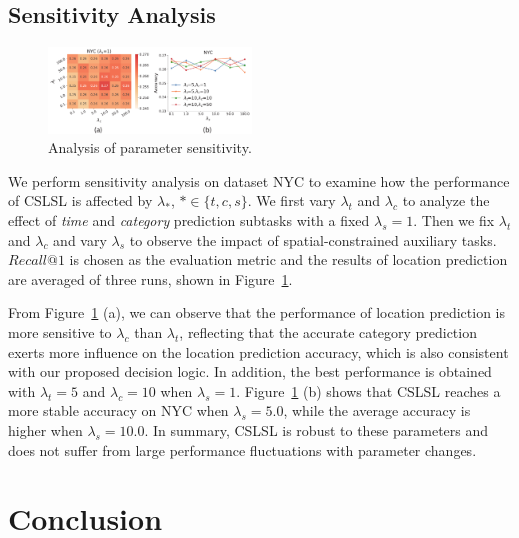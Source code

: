 \documentclass[sigconf]{acmart}
\begin{document}
\subsection{Sensitivity Analysis}

    \begin{figure}[bt]
        \begin{center}
        \includegraphics[width=0.48\textwidth]{figure/sensitivity.pdf}
        \end{center}
        \caption{Analysis of parameter sensitivity.}
        \label{fig:sensitivity}
    \end{figure}

    We perform sensitivity analysis on dataset NYC to examine how the performance of CSLSL is affected by $\lambda_*$, $*\in\{t,c,s\}$. We first vary $\lambda_t$ and $\lambda_c$ to analyze the effect of \textit{time} and \textit{category} prediction subtasks with a fixed $\lambda_s=1$. Then we fix $\lambda_t$ and $\lambda_c$ and vary $\lambda_s$ to observe the impact of spatial-constrained auxiliary tasks. $Recall@1$ is chosen as the evaluation metric and the results of location prediction are averaged of three runs, shown in Figure~\ref{fig:sensitivity}.

    From Figure~\ref{fig:sensitivity} (a), we can observe that the performance of location prediction is more sensitive to $\lambda_c$ than $\lambda_t$, reflecting that the accurate category prediction exerts more influence on the location prediction accuracy, which is also consistent with our proposed decision logic. In addition, the best performance is obtained with $\lambda_t=5$ and $\lambda_c=10$ when $\lambda_s=1$. Figure~\ref{fig:sensitivity} (b) shows that CSLSL reaches a more stable accuracy on NYC when $\lambda_s=5.0$, while the average accuracy is higher when $\lambda_s=10.0$. In summary, CSLSL is robust to these parameters and does not suffer from large performance fluctuations with parameter changes.


\section{Conclusion}
    
\end{document}
